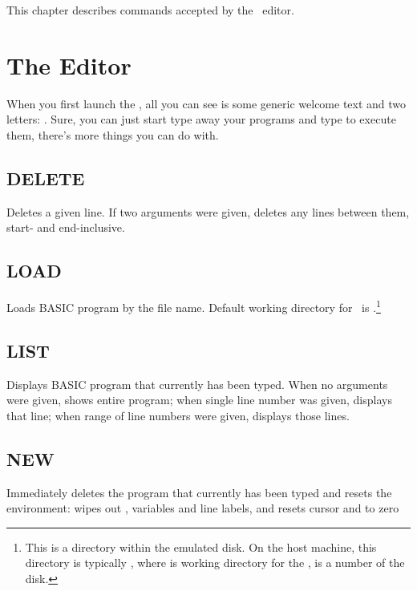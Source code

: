 This chapter describes commands accepted by the \tbas\ editor.

\section{The Editor}

When you first launch the \tbas, all you can see is some generic welcome text and two letters: . Sure, you can just start type away your programs and type  to execute them, there's more things you can do with.

\subsection{DELETE}
    \par
    Deletes a given line. If two arguments were given, deletes any lines between them, start- and end-inclusive.

\subsection{LOAD}
    \par
    Loads BASIC program by the file name. Default working directory for \tbas\ is .\footnote{This is a directory within the emulated disk. On the host machine, this directory is typically , where  is working directory for the \thismachine,  is a number of the disk.}
    
\subsection{LIST}
    \par
    Displays BASIC program that currently has been typed. When no arguments were given, shows entire program; when single line number was given, displays that line; when range of line numbers were given, displays those lines.
    
\subsection{NEW}
    \par
    Immediately deletes the program that currently has been typed and resets the environment: wipes out , variables and line labels, and resets  cursor and  to zero
    
